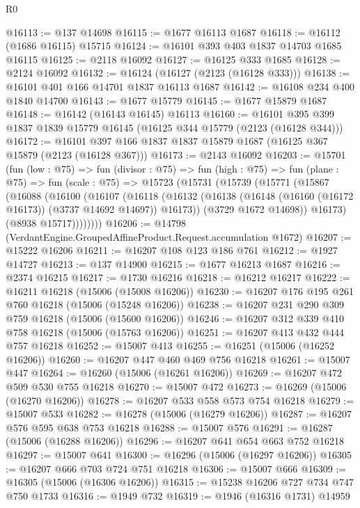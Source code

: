 \begin{lexlean}{R0}
\begin{coremodule}
@16113 := @137 @14698
@16115 := @1677 @16113 @1687
@16118 := @16112 (@1686 @16115) @15715
@16124 := @16101 @393 @403 @1837 @14703 @1685 @16115
@16125 := @2118 @16092
@16127 := @16125 @333 @1685
@16128 := @2124 @16092
@16132 := @16124 (@16127 (@2123 (@16128 @333)))
@16138 := @16101 @401 @166 @14701 @1837 @16113 @1687
@16142 := @16108 @234 @400 @1840 @14700
@16143 := @1677 @15779
@16145 := @1677 @15879 @1687
@16148 := @16142 (@16143 @16145) @16113
@16160 := @16101 @395 @399 @1837 @1839 @15779 @16145 (@16125 @344 @15779 (@2123 (@16128 @344)))
@16172 := @16101 @397 @166 @1837 @1837 @15879 @1687 (@16125 @367 @15879 (@2123 (@16128 @367)))
@16173 := @2143 @16092
@16203 := @15701
    (fun (low : @75) =>
    fun (divisor : @75) =>
    fun (high : @75) =>
    fun (plane : @75) =>
    fun (scale : @75) =>
    @15723
      (@15731
        (@15739
          (@15771
            (@15867
              (@16088
                (@16100
                  (@16107
                    (@16118
                      (@16132
                        (@16138 (@16148 (@16160 (@16172 @16173)) (@3737 @14692 @14697)) @16173))
                      (@3729 @1672 @14698))
                    @16173)
                  (@8938 @15717))))))))
@16206 := @14798 (VerdantEngine.GroupedAffineProduct.Request.accumulation @1672)
@16207 := @15222 @16206
@16211 := @16207 @108 @123 @186 @761
@16212 := @1927 @14727
@16213 := @137 @14900
@16215 := @1677 @16213 @1687
@16216 := @2374 @16215
@16217 := @1730 @16216
@16218 := @16212 @16217
@16222 := @16211 @16218 (@15006 (@15008 @16206))
@16230 := @16207 @176 @195 @261 @760 @16218 (@15006 (@15248 @16206))
@16238 := @16207 @231 @290 @309 @759 @16218 (@15006 (@15600 @16206))
@16246 := @16207 @312 @339 @410 @758 @16218 (@15006 (@15763 @16206))
@16251 := @16207 @413 @432 @444 @757 @16218
@16252 := @15007 @413
@16255 := @16251 (@15006 (@16252 @16206))
@16260 := @16207 @447 @460 @469 @756 @16218
@16261 := @15007 @447
@16264 := @16260 (@15006 (@16261 @16206))
@16269 := @16207 @472 @509 @530 @755 @16218
@16270 := @15007 @472
@16273 := @16269 (@15006 (@16270 @16206))
@16278 := @16207 @533 @558 @573 @754 @16218
@16279 := @15007 @533
@16282 := @16278 (@15006 (@16279 @16206))
@16287 := @16207 @576 @595 @638 @753 @16218
@16288 := @15007 @576
@16291 := @16287 (@15006 (@16288 @16206))
@16296 := @16207 @641 @654 @663 @752 @16218
@16297 := @15007 @641
@16300 := @16296 (@15006 (@16297 @16206))
@16305 := @16207 @666 @703 @724 @751 @16218
@16306 := @15007 @666
@16309 := @16305 (@15006 (@16306 @16206))
@16315 := @15238 @16206 @727 @734 @747 @750 @1733
@16316 := @1949 @732
@16319 := @1946 (@16316 @1731) @14959

\end{coremodule}
\end{lexlean}
